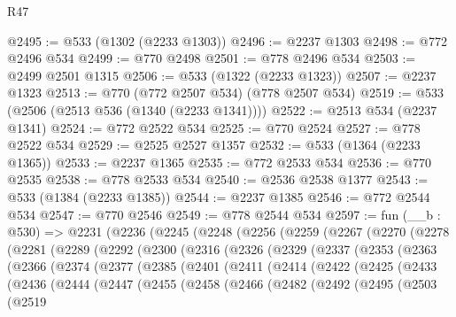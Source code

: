 \begin{lexlean}{R47}
\begin{coremodule}
@2495 := @533 (@1302 (@2233 @1303))
@2496 := @2237 @1303
@2498 := @772 @2496 @534
@2499 := @770 @2498
@2501 := @778 @2496 @534
@2503 := @2499 @2501 @1315
@2506 := @533 (@1322 (@2233 @1323))
@2507 := @2237 @1323
@2513 := @770 (@772 @2507 @534) (@778 @2507 @534)
@2519 := @533 (@2506 (@2513 @536 (@1340 (@2233 @1341))))
@2522 := @2513 @534 (@2237 @1341)
@2524 := @772 @2522 @534
@2525 := @770 @2524
@2527 := @778 @2522 @534
@2529 := @2525 @2527 @1357
@2532 := @533 (@1364 (@2233 @1365))
@2533 := @2237 @1365
@2535 := @772 @2533 @534
@2536 := @770 @2535
@2538 := @778 @2533 @534
@2540 := @2536 @2538 @1377
@2543 := @533 (@1384 (@2233 @1385))
@2544 := @2237 @1385
@2546 := @772 @2544 @534
@2547 := @770 @2546
@2549 := @778 @2544 @534
@2597 := fun (__b : @530) =>
  @2231
    (@2236
      (@2245
        (@2248
          (@2256
            (@2259
              (@2267
                (@2270
                  (@2278
                    (@2281
                      (@2289
                        (@2292
                          (@2300
                            (@2316
                              (@2326
                                (@2329
                                  (@2337
                                    (@2353
                                      (@2363
                                        (@2366
                                          (@2374
                                            (@2377
                                              (@2385
                                                (@2401
                                                  (@2411
                                                    (@2414
                                                      (@2422
                                                        (@2425
                                                          (@2433
                                                            (@2436
                                                              (@2444
                                                                (@2447
                                                                  (@2455
                                                                    (@2458
                                                                      (@2466
                                                                        (@2482
                                                                          (@2492
                                                                            (@2495
                                                                              (@2503
                                                                                (@2519

\end{coremodule}
\end{lexlean}
